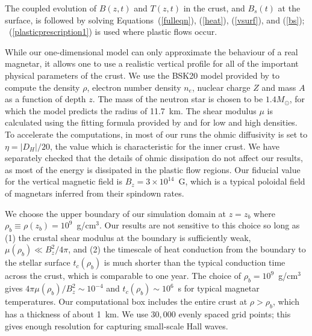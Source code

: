 The coupled evolution of $B(z,t)$ and $T(z,t)$ in the crust, and $B_s(t)$ at the surface, is followed by solving Equations~(\ref{fulleqn}), (\ref{heat}), (\ref{vsurf}), and (\ref{bs}); \Eq~(\ref{plasticprescription1}) is used where plastic flows occur.

While our one-dimensional model can only approximate the behaviour of a real magnetar, it allows one to use a realistic vertical profile for all of the important physical parameters of the crust.
We use the BSK20 model provided by \citet{2013A&A...560A..48P} to compute the density $\rho$, electron number density $n_e$, nuclear charge $Z$ and mass $A$ as a function of depth $z$. 
The mass  of the neutron star is chosen to be $1.4M_{\odot}$, for which the model predicts the radius of  11.7~km.
The shear modulus $\mu$ is calculated using the fitting formula provided by \citet{2005ApJ...634L.153P} and \citet{2007MNRAS.375..261S} for low and high densities. 
To accelerate the computations, in most of our runs the ohmic diffusivity  is set to $\eta = |D_H|/20$, the value which is characteristic for the inner crust. We have separately checked that the details of ohmic dissipation do not affect our results, as most of the energy is dissipated in the plastic flow regions.  
Our fiducial value for the vertical magnetic field is $B_z = 3\times 10^{14}$~G, which is a typical poloidal field of magnetars inferred from their spindown rates.

We choose the upper boundary of our simulation domain at $z=z_b$ where $\rho_b\equiv\rho(z_b)=10^{9}$~g/cm$^3$. 
Our results are not sensitive to this choice so long as 
(1) the crustal shear modulus at the boundary is sufficiently weak, $\mu(\rho_b)\ll B_z^2/4\pi$, and (2) the timescale of heat conduction from the boundary to the stellar surface $t_c(\rho_b)$ is much shorter than the typical conduction time across the crust, which is comparable to one year. 
The choice of $\rho_b=10^9$~g/cm$^3$ gives $4\pi\mu(\rho_b)/B_z^2\sim 10^{-4}$ and $t_c(\rho_b)\sim 10^6$~s for typical magnetar temperatures. 
Our computational box includes the entire crust at $\rho>\rho_b$, which has a
thickness of about 1~km. 
We use $30,000$ evenly spaced grid points; this gives enough resolution for capturing small-scale Hall waves.

